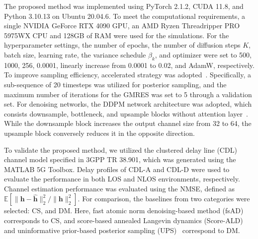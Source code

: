 \documentclass[lettersize,journal]{IEEEtran}
\newcommand{\tred}{\textcolor{red}}
\begin{document}
The proposed method was implemented using PyTorch 2.1.2, CUDA 11.8, and Python 3.10.13 on Ubuntu 20.04.6. To meet the computational requirements, a single NVIDIA GeForce RTX 4090 GPU, an AMD Ryzen Threadripper PRO 5975WX CPU and 128GB of RAM were used for the simulations. For the hyperparameter settings, the number of epochs, the number of diffusion steps $K$, batch size, learning rate, the variance schedule $\beta_{k}$, and optimizer were set to 500, 1000, 256, 0.0001, linearly increase from 0.0001 to 0.02, and AdamW, respectively.
To improve sampling efficiency, accelerated strategy was adopted~\cite{songDenoisingDiffusionImplicit2020}. Specifically, a sub-sequence of 20 timesteps was utilized for posterior sampling, and the maximum number of iterations for the GMRES was set to 5 through a validation set. For denoising networks, the DDPM network architecture was adopted, which consists downsample, bottleneck, and upsample blocks without attention layer~\cite{hoDenoisingDiffusionProbabilistic2020}. While the downsample block increases the output channel size from 32 to 64, the upsample block conversely reduces it in the opposite direction.

To validate the proposed method, we utilized the clustered delay line (CDL) channel model specified in 3GPP TR 38.901, which was generated using the MATLAB 5G Toolbox. Delay profiles of CDL-A and CDL-D were used to evaluate the performance in both LOS and NLOS environments, respectively. Channel estimation performance was evaluated using the NMSE, defined as $\mathbb{E}[\|\mathbf{h}-\hat{\mathbf{h}}\|_{2}^{2} / \|\mathbf{h}\|_{2}^{2}]$. For comparison, the baselines from two categories were selected: CS, and DM. Here, fast atomic norm denoising-based method (fsAD)~\cite{zhangAtomicNormDenoisingBased2018} corresponds to CS, and score-based annealed Langevin dynamics (Score-ALD)~\cite{arvinteMIMOChannelEstimation2023} and uninformative prior-based posterior sampling (UPS)~\cite{zhouGenerativeDiffusionModels2025} correspond to DM.

\end{document}
